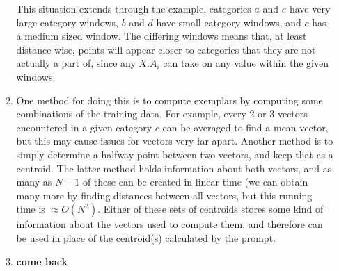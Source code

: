 \documentclass{article}
\begin{document}
\begin{enumerate}
\begin{enumerate}
			This situation extends through the example, categories $a$ and $e$ have very large category windows, $b$ and $d$ have small category windows, and $c$ has a medium sized window.  The differing windows means that, at least distance-wise, points will appear closer to categories that they are not actually a part of, since any $X.A_i$ can take on any value within the given windows.
			
			\item One method for doing this is to compute exemplars by computing some combinations of the training data.  For example, every 2 or 3 vectors encountered in a given category $c$ can be averaged to find a mean vector, but this may cause issues for vectors very far apart.  Another method is to simply determine a halfway point between two vectors, and keep that as a centroid.  The latter method holds information about both vectors, and as many as $N-1$ of these can be created in linear time (we can obtain many more by finding distances between all vectors, but this running time is $\approx O(N^2)$.  Either of these sets of centroids stores some kind of information about the vectors used to compute them, and therefore can be used in place of the centroid(s) calculated by the prompt.
			
			\item \textbf{come back}
		\end{enumerate}
	\end{enumerate}
\end{document}
